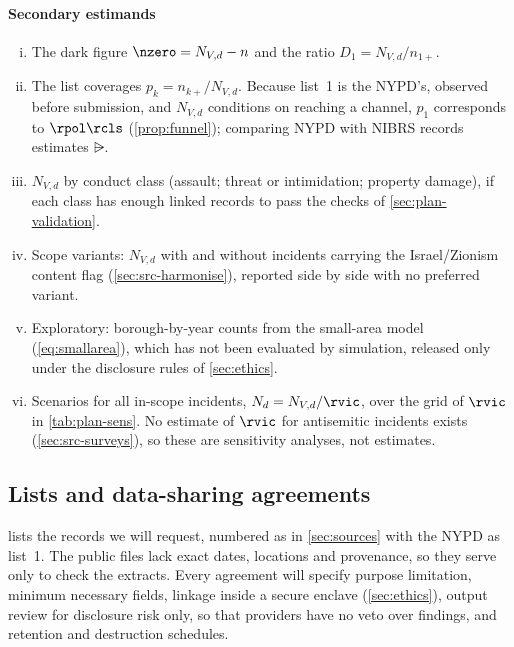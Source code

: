 \paragraph{Secondary estimands}
\begin{enumerate}[(i)]
  \item The dark figure $\nzero=N_{V,d}-n$ and the ratio $D_1=N_{V,d}/n_{1+}$.
  \item The list coverages $p_k=n_{k+}/N_{V,d}$. Because list~1 is the NYPD's, observed before submission, and $N_{V,d}$ conditions on reaching a channel, $p_1$ corresponds to $\rpol\rcls$ (\cref{prop:funnel}); comparing NYPD with NIBRS records estimates $\rsub$.
  \item $N_{V,d}$ by conduct class (assault; threat or intimidation; property damage), if each class has enough linked records to pass the checks of \cref{sec:plan-validation}.
  \item Scope variants: $N_{V,d}$ with and without incidents carrying the Israel/Zionism content flag (\cref{sec:src-harmonise}), reported side by side with no preferred variant.
  \item Exploratory: borough-by-year counts from the small-area model (\cref{eq:smallarea}), which has not been evaluated by simulation, released only under the disclosure rules of \cref{sec:ethics}.
  \item Scenarios for all in-scope incidents, $N_d=N_{V,d}/\rvic$, over the grid of $\rvic$ in \cref{tab:plan-sens}. No estimate of $\rvic$ for antisemitic incidents exists (\cref{sec:src-surveys}), so these are sensitivity analyses, not estimates.
\end{enumerate}

\subsection{Lists and data-sharing agreements}\label{sec:plan-lists}

 lists the records we will request, numbered as in \cref{sec:sources} with the NYPD as list~1. The public files lack exact dates, locations and provenance, so they serve only to check the extracts. Every agreement will specify purpose limitation, minimum necessary fields, linkage inside a secure enclave (\cref{sec:ethics}), output review for disclosure risk only, so that providers have no veto over findings, and retention and destruction schedules.

